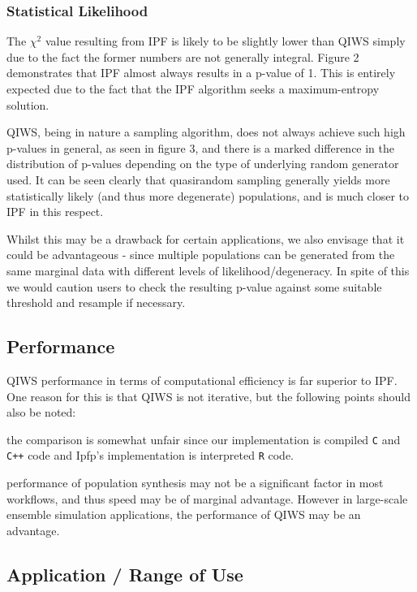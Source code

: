 \documentclass{JASSS}
\begin{document}
\subsubsection{Statistical Likelihood}\label{degeneracy}

The \(\chi^2\) value resulting from IPF is likely to be slightly lower
than QIWS simply due to the fact the former numbers are not generally integral.
Figure 2 demonstrates that IPF almost always results in a p-value of 1.
This is entirely expected due to the fact that the IPF algorithm seeks a 
maximum-entropy solution.

QIWS, being in nature a sampling algorithm, does not always achieve such high p-values in general, 
as seen in figure 3, and there is a marked difference in the distribution of p-values
depending on the type of underlying random generator used. It can be
seen clearly that quasirandom sampling generally yields more statistically likely (and thus more degenerate)
populations, and is much closer to IPF in this respect.

Whilst this may be a drawback for certain applications, we also envisage that it could be advantageous - since multiple populations can be generated from the same marginal data with different levels of likelihood/degeneracy. In spite of this we would caution users to check the resulting p-value against some suitable threshold and resample if necessary.

\subsection{Performance}\label{performance-1}

QIWS performance in terms of computational efficiency is far superior to IPF. One reason for this is that
QIWS is not iterative, but the following points should also be noted:

\begin{itemize*}
\item
  the comparison is somewhat unfair since our implementation is compiled
  \texttt{C} and \texttt{C++} code and Ipfp's implementation is
  interpreted \texttt{R} code.
\item
  performance of population synthesis may not be a significant factor in
  most workflows, and thus speed may be of marginal advantage. However
  in large-scale ensemble simulation applications, the performance of
  QIWS may be an advantage.
\end{itemize*}

\subsection{Application / Range of Use}\label{application-range-of-use}
\end{document}
